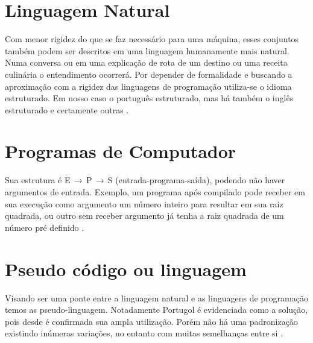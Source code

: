 \section{Linguagem Natural}

Com menor rigidez do que se faz necessário para uma máquina, esses conjuntos também podem ser descritos em uma linguagem humanamente mais natural. Numa conversa ou em uma explicação de rota de um destino ou uma receita culinária o entendimento ocorrerá. Por depender de formalidade e buscando a aproximação com a rigidez das linguagens de programação utiliza-se o idioma estruturado. Em nosso caso o português estruturado, mas há também o inglês estruturado e certamente outras .

\section{Programas de Computador}

Sua estrutura é E$\,\to\,$P$\,\to\,$S (entrada-programa-saída), podendo não haver argumentos de entrada. Exemplo, um programa após compilado pode receber em sua execução como argumento um número inteiro para resultar em sua raiz quadrada, ou outro sem receber argumento já tenha a raiz quadrada de um número pré definido .

\section{Pseudo código ou linguagem}

Visando ser uma ponte entre a linguagem natural e as linguagens de programação temos as pseudo-linguagem. Notadamente Portugol é evidenciada como a solução, pois desde  é confirmada sua ampla utilização. Porém não há uma padronização existindo inúmeras variações, no entanto com muitas semelhanças entre si .





